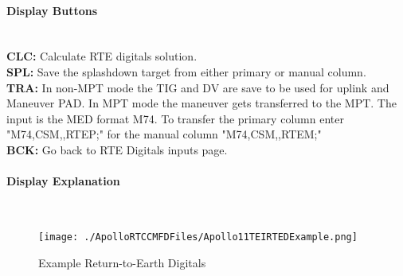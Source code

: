 \documentclass[11pt]{article} %
\begin{document}
\paragraph{Display Buttons}\mbox{} \\

\textbf{CLC:} Calculate RTE digitals solution.\\
\textbf{SPL:} Save the splashdown target from either primary or manual column.\\
\textbf{TRA:} In non-MPT mode the TIG and DV are save to be used for uplink and Maneuver PAD. In MPT mode the maneuver gets transferred to the MPT. The input is the MED format M74. To transfer the primary column enter "M74,CSM,,RTEP;" for the manual column "M74,CSM,,RTEM;"\\
\textbf{BCK:} Go back to RTE Digitals inputs page.\\
\newpage
\paragraph{Display Explanation}\mbox{} \\

\begin{figure}[hp]
	\centering
		\texttt{[image: ./ApolloRTCCMFDFiles/Apollo11TEIRTEDExample.png]}
	\caption{Example Return-to-Earth Digitals}
	\label{fig:Apollo11TEIRTEDExample}
\end{figure}
\end{document}
